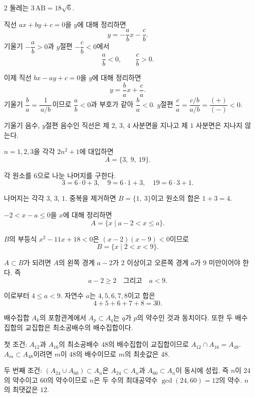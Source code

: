 \documentclass[10pt,fleqn]{article}
\begin{document}
\begin{multicols}{2}
둘레는 $3\,\overline{\mathrm{AB}} = 18\sqrt{6}$.


직선 $ax + by + c = 0$을 $y$에 대해 정리하면
\[ y = -\dfrac{a}{b}x - \dfrac{c}{b}. \] 기울기 $-\dfrac{a}{b} > 0$과 $y$절편 $-\dfrac{c}{b} < 0$에서
\[ \dfrac{a}{b} < 0, \qquad \dfrac{c}{b} > 0. \]

이제 직선 $bx - ay + c = 0$을 $y$에 대해 정리하면
\[ y = \dfrac{b}{a}x + \dfrac{c}{a}. \]
기울기 $\dfrac{b}{a} = \dfrac{1}{\,a/b\,}$이므로 $\dfrac{a}{b} < 0$과 부호가 같아 $\dfrac{b}{a} < 0$. $y$절편 $\dfrac{c}{a} = \dfrac{c/b}{a/b} = \dfrac{(+)}{(-)} < 0$.

기울기 음수, $y$절편 음수인 직선은 제 $2$, $3$, $4$ 사분면을 지나고 제 $1$ 사분면은 지나지 않는다.


$n = 1, 2, 3$을 각각 $2n^{2} + 1$에 대입하면
\[ A = \{3,\ 9,\ 19\}. \]

각 원소를 $6$으로 나눈 나머지를 구한다.
\[ 3 = 6\cdot 0 + 3,\quad 9 = 6\cdot 1 + 3,\quad 19 = 6\cdot 3 + 1. \]

나머지는 각각 $3$, $3$, $1$. 중복을 제거하면 $B = \{1,\ 3\}$이고 원소의 합은 $1 + 3 = 4$.


$-2 < x - a \le 0$을 $x$에 대해 정리하면
\[ A = \{x \mid a - 2 < x \le a\}. \]

$B$의 부등식 $x^{2} - 11x + 18 < 0$은 $(x-2)(x-9) < 0$이므로
\[ B = \{x \mid 2 < x < 9\}. \]

$A \subset B$가 되려면 $A$의 왼쪽 경계 $a - 2$가 $2$ 이상이고 오른쪽 경계 $a$가 $9$ 미만이어야 한다. 즉
\[ a - 2 \ge 2 \quad \text{그리고} \quad a < 9. \]

이로부터 $4 \le a < 9$. 자연수 $a$는 $4, 5, 6, 7, 8$이고 합은
\[ 4 + 5 + 6 + 7 + 8 = 30. \]


배수집합 $A_{k}$의 포함관계에서 $A_{p} \subset A_{q}$는 $q$가 $p$의 약수인 것과 동치이다. 또한 두 배수집합의 교집합은 최소공배수의 배수집합이다.

첫 조건: $A_{12}$과 $A_{16}$의 최소공배수 $48$의 배수집합이 교집합이므로 $A_{12} \cap A_{16} = A_{48}$. $A_{m} \subset A_{48}$이려면 $m$이 $48$의 배수이므로 $m$의 최솟값은 $48$.

두 번째 조건: $(A_{24} \cup A_{60}) \subset A_{n}$은 $A_{24} \subset A_{n}$과 $A_{60} \subset A_{n}$이 동시에 성립. 즉 $n$이 $24$의 약수이고 $60$의 약수이므로 $n$은 두 수의 최대공약수 $\gcd(24, 60) = 12$의 약수. $n$의 최댓값은 $12$.


\end{multicols}
\end{document}
